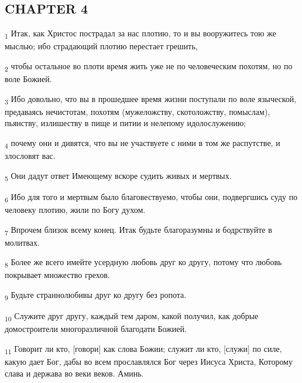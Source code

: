 \subsection{CHAPTER 4}
\begin{tcolorbox}
\textsubscript{1} Итак, как Христос пострадал за нас плотию, то и вы вооружитесь тою же мыслью; ибо страдающий плотию перестает грешить,
\end{tcolorbox}
\begin{tcolorbox}
\textsubscript{2} чтобы остальное во плоти время жить уже не по человеческим похотям, но по воле Божией.
\end{tcolorbox}
\begin{tcolorbox}
\textsubscript{3} Ибо довольно, что вы в прошедшее время жизни поступали по воле языческой, предаваясь нечистотам, похотям (мужеложству, скотоложству, помыслам), пьянству, излишеству в пище и питии и нелепому идолослужению;
\end{tcolorbox}
\begin{tcolorbox}
\textsubscript{4} почему они и дивятся, что вы не участвуете с ними в том же распутстве, и злословят вас.
\end{tcolorbox}
\begin{tcolorbox}
\textsubscript{5} Они дадут ответ Имеющему вскоре судить живых и мертвых.
\end{tcolorbox}
\begin{tcolorbox}
\textsubscript{6} Ибо для того и мертвым было благовествуемо, чтобы они, подвергшись суду по человеку плотию, жили по Богу духом.
\end{tcolorbox}
\begin{tcolorbox}
\textsubscript{7} Впрочем близок всему конец. Итак будьте благоразумны и бодрствуйте в молитвах.
\end{tcolorbox}
\begin{tcolorbox}
\textsubscript{8} Более же всего имейте усердную любовь друг ко другу, потому что любовь покрывает множество грехов.
\end{tcolorbox}
\begin{tcolorbox}
\textsubscript{9} Будьте страннолюбивы друг ко другу без ропота.
\end{tcolorbox}
\begin{tcolorbox}
\textsubscript{10} Служите друг другу, каждый тем даром, какой получил, как добрые домостроители многоразличной благодати Божией.
\end{tcolorbox}
\begin{tcolorbox}
\textsubscript{11} Говорит ли кто, [говори] как слова Божии; служит ли кто, [служи] по силе, какую дает Бог, дабы во всем прославлялся Бог через Иисуса Христа, Которому слава и держава во веки веков. Аминь.
\end{tcolorbox}

